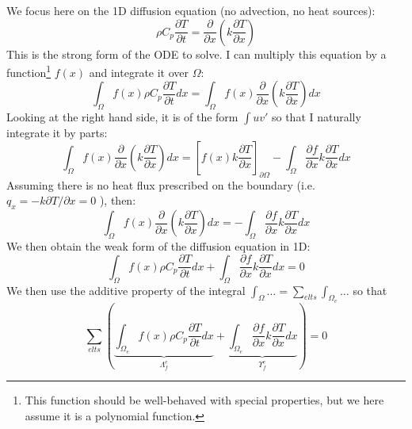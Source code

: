 We focus here on the 1D diffusion equation (no advection, no heat sources):
\begin{equation}
\rho C_p \frac{\partial T}{\partial t} 
= \frac{\partial }{\partial x} \left( k \frac{\partial T}{\partial x}  \right)
\end{equation}
This is the {\color{olive}strong form} of the ODE to solve.
I can multiply this equation by a function\footnote{This function should be well-behaved with special properties, but we here assume it is a polynomial function.} $f(x)$ and integrate it over $\Omega$:
\begin{equation}
\int_{\Omega} f(x)  \rho C_p\frac{\partial T}{\partial t} dx
=
\int_{\Omega} f(x) \frac{\partial }{\partial x} \left( k \frac{\partial T}{\partial x}  \right) dx
\end{equation}
Looking at the right hand side, it is of the form $\int u v'$ so that I naturally 
integrate it by parts:
\begin{equation}
\int_{\Omega} f(x) \frac{\partial }{\partial x} 
\left( k \frac{\partial T}{\partial x}  \right) dx
=
\left[
f(x) k \frac{\partial T}{\partial x}
\right]_{\partial \Omega}
-
\int_{\Omega} \frac{\partial f}{\partial x}  k \frac{\partial T}{\partial x}  dx
\end{equation}
Assuming there is no heat flux prescribed on the boundary (i.e. $q_x= - k \partial T/\partial x = 0$ ),
 then:
\begin{equation}
\int_{\Omega} f(x) \frac{\partial }{\partial x} \left( k \frac{\partial T}{\partial x}  \right) dx
=
- \int_{\Omega} \frac{\partial f}{\partial x}  k \frac{\partial T}{\partial x}  dx
\end{equation}
We then obtain the {\color{olive}weak form} of the diffusion equation in 1D:
\begin{equation}
\boxed{
\int_{\Omega} f(x) \rho C_p \frac{\partial T}{\partial t} dx
+
\int_{\Omega} \frac{\partial f}{\partial x}  k \frac{\partial T}{\partial x}  dx = 0
}
\end{equation}
We then use the additive property of the integral 
$\int_\Omega \dots = \sum_{elts} \int_{\Omega_e} \dots$
so that 
\begin{equation}
\sum_{elts} \left(     
\underbrace{ \int_{\Omega_e} f(x) \rho C_p   \frac{\partial T}{\partial t} dx }_{{\Lambda}_f^e}
+
\underbrace{\int_{\Omega_e} \frac{\partial f}{\partial x}  k \frac{\partial T}{\partial x}  dx}_{{\Upsilon}_f^e}      \right) = 0  
\end{equation}

